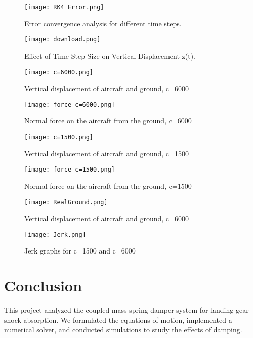 \documentclass[12pt,letterpaper, onecolumn]{exam}
\begin{document}
\begin{questions}
\begin{figure}[h!]
    \centering
    \texttt{[image: RK4 Error.png]}
    \caption{Error convergence analysis for different time steps.}
\end{figure}

\begin{figure}[h!]
    \centering
    \texttt{[image: download.png]}
    \caption{Effect of Time Step Size on Vertical Displacement z(t).}
\end{figure}

\begin{figure}[h!]
    \centering
    \texttt{[image: c=6000.png]}
    \caption{Vertical displacement of aircraft and ground, c=6000}
    \label{fig:c=6000}
\end{figure}

\begin{figure}[h!]
    \centering
    \texttt{[image: force c=6000.png]}
    \caption{Normal force on the aircraft from the ground, c=6000}
    \label{fig:force}
\end{figure}

\begin{figure}[h!]
    \centering
    \texttt{[image: c=1500.png]}
    \caption{Vertical displacement of aircraft and ground, c=1500}
    \label{fig:c=1500}
\end{figure}

\begin{figure}[h!]
    \centering
    \texttt{[image: force c=1500.png]}
    \caption{Normal force on the aircraft from the ground, c=1500}
    \label{fig:force2}
\end{figure}

\begin{figure}[h!]
    \centering
    \texttt{[image: RealGround.png]}
    \caption{Vertical displacement of aircraft and ground, c=6000}
    \label{fig:RealGround}
\end{figure}

\begin{figure}[h!]
    \centering
    \texttt{[image: Jerk.png]}
    \caption{Jerk graphs for c=1500 and c=6000}
    \label{fig:Jerk}
\end{figure}

\end{questions}
\FloatBarrier

\section{Conclusion}
This project analyzed the coupled mass-spring-damper system for landing gear shock absorption. We formulated the equations of motion, implemented a numerical solver, and conducted simulations to study the effects of damping.
\end{document}
